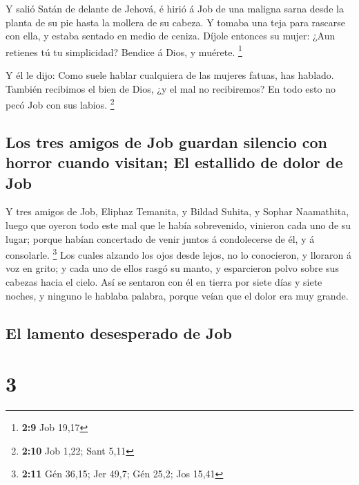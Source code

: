  Y salió Satán de delante de Jehová, é hirió á Job de una
maligna sarna desde la planta de su pie hasta la mollera de su cabeza.
 Y tomaba una teja para rascarse con ella, y estaba
sentado en medio de ceniza.  Díjole entonces su mujer:
¿Aun retienes tú tu simplicidad? Bendice á Dios, y muérete. \footnote{\textbf{2:9}
  Job 19,17}

 Y él le dijo: Como suele hablar cualquiera de las
mujeres fatuas, has hablado. También recibimos el bien de Dios, ¿y el
mal no recibiremos? En todo esto no pecó Job con sus labios. \footnote{\textbf{2:10}
  Job 1,22; Sant 5,11}

\hypertarget{los-tres-amigos-de-job-guardan-silencio-con-horror-cuando-visitan-el-estallido-de-dolor-de-job}{%
\subsection{Los tres amigos de Job guardan silencio con horror cuando
visitan; El estallido de dolor de
Job}\label{los-tres-amigos-de-job-guardan-silencio-con-horror-cuando-visitan-el-estallido-de-dolor-de-job}}

 Y tres amigos de Job, Eliphaz Temanita, y Bildad Suhita,
y Sophar Naamathita, luego que oyeron todo este mal que le había
sobrevenido, vinieron cada uno de su lugar; porque habían concertado de
venir juntos á condolecerse de él, y á consolarle. \footnote{\textbf{2:11}
  Gén 36,15; Jer 49,7; Gén 25,2; Jos 15,41}  Los cuales
alzando los ojos desde lejos, no lo conocieron, y lloraron á voz en
grito; y cada uno de ellos rasgó su manto, y esparcieron polvo sobre sus
cabezas hacia el cielo.  Así se sentaron con él en tierra
por siete días y siete noches, y ninguno le hablaba palabra, porque
veían que el dolor era muy grande.

\hypertarget{el-lamento-desesperado-de-job}{%
\subsection{El lamento desesperado de
Job}\label{el-lamento-desesperado-de-job}}

\hypertarget{section-2}{%
\section{3}\label{section-2}}

